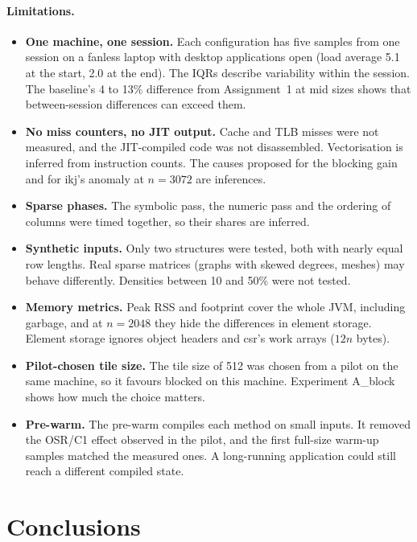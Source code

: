 \documentclass[11pt,a4paper]{article}
\begin{document}
\paragraph{Limitations.}
\begin{itemize}
  \item \textbf{One machine, one session.} Each configuration has five samples
  from one session on a fanless laptop with desktop applications open (load
  average 5.1 at the start, 2.0 at the end). The IQRs describe variability
  within the session. The baseline's 4 to 13\% difference from Assignment~1 at
  mid sizes shows that between-session differences can exceed them.
  \item \textbf{No miss counters, no JIT output.} Cache and TLB misses were not
  measured, and the JIT-compiled code was not disassembled. Vectorisation is
  inferred from instruction counts. The causes proposed for the blocking gain
  and for ikj's anomaly at $n=3072$ are inferences.
  \item \textbf{Sparse phases.} The symbolic pass, the numeric pass and the
  ordering of columns were timed together, so their shares are inferred.
  \item \textbf{Synthetic inputs.} Only two structures were tested, both with
  nearly equal row lengths. Real sparse matrices (graphs with skewed degrees,
  meshes) may behave differently. Densities between 10 and 50\% were not tested.
  \item \textbf{Memory metrics.} Peak RSS and footprint cover the whole JVM,
  including garbage, and at $n=2048$ they hide the differences in element
  storage. Element storage ignores object headers and csr's work arrays
  ($12n$ bytes).
  \item \textbf{Pilot-chosen tile size.} The tile size of 512 was chosen from a
  pilot on the same machine, so it favours blocked on this machine.
  Experiment A\_block shows how much the choice matters.
  \item \textbf{Pre-warm.} The pre-warm compiles each method on small inputs.
  It removed the OSR/C1 effect observed in the pilot, and the first full-size
  warm-up samples matched the measured ones. A long-running application could
  still reach a different compiled state.
\end{itemize}

\section{Conclusions}
\label{sec:conclusions}
\end{document}
